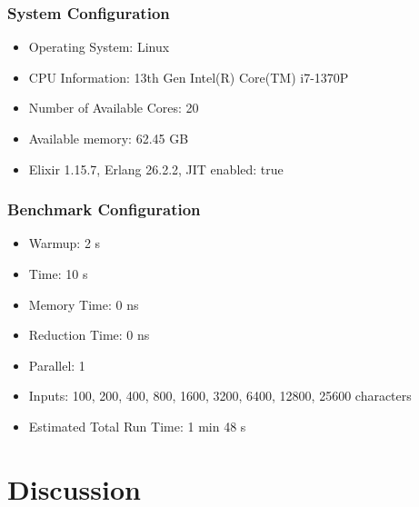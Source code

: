 \documentclass[a4paper,11pt]{article}
\begin{document}
\subsubsection*{System Configuration}
\begin{itemize}
    \item Operating System: Linux
    \item CPU Information: 13th Gen Intel(R) Core(TM) i7-1370P
    \item Number of Available Cores: 20
    \item Available memory: 62.45 GB
    \item Elixir 1.15.7, Erlang 26.2.2, JIT enabled: true
\end{itemize}

\subsubsection*{Benchmark Configuration}
\begin{itemize}
    \item Warmup: 2 s
    \item Time: 10 s
    \item Memory Time: 0 ns
    \item Reduction Time: 0 ns
    \item Parallel: 1
    \item Inputs: 100, 200, 400, 800, 1600, 3200, 6400, 12800, 25600 characters
    \item Estimated Total Run Time: 1 min 48 s
\end{itemize}





\section*{Discussion}\label{sec:discussion}
\end{document}
